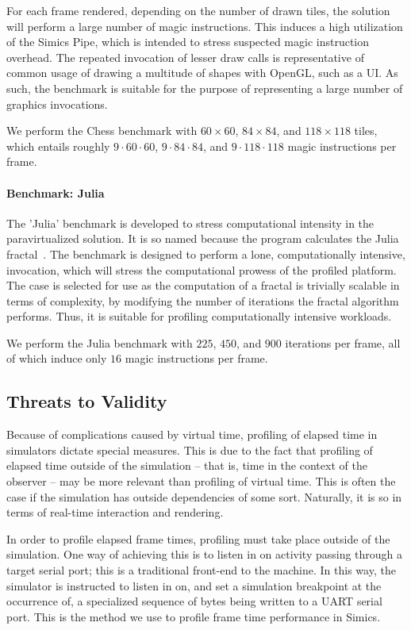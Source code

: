 \documentclass{article}
\newcommand{\masccite}[2][]{\cite{#2}}
\begin{document}
For each frame rendered, depending on the number of drawn tiles, the solution will perform a large number of magic instructions.
This induces a high utilization of the Simics Pipe, which is intended to stress suspected magic instruction overhead.
The repeated invocation of lesser draw calls is representative of common usage of drawing a multitude of shapes with OpenGL, such as a UI.
As such, the benchmark is suitable for the purpose of representing a large number of graphics invocations.

We perform the Chess benchmark with $60\times60$, $84\times84$, and $118\times118$ tiles, which entails roughly $9\cdot60\cdot60$, $9\cdot84\cdot84$, and $9\cdot118\cdot118$ magic instructions per frame.

\paragraph{Benchmark: Julia}
\label{par:experimentalmethodology_benchmarking_benchmarkjulia}
The 'Julia' benchmark is developed to stress computational intensity in the paravirtualized solution.
It is so named because the program calculates the Julia fractal~\masccite{web:tsiombikas:2014}.
The benchmark is designed to perform a lone, computationally intensive, invocation, which will stress the computational prowess of the profiled platform.
The case is selected for use as the computation of a fractal is trivially scalable in terms of complexity, by modifying the number of iterations the fractal algorithm performs.
Thus, it is suitable for profiling computationally intensive workloads.

We perform the Julia benchmark with $225$, $450$, and $900$ iterations per frame, all of which induce only $16$ magic instructions per frame.

\subsection{Threats to Validity}
\label{sec:threatstovalidity}
Because of complications caused by virtual time, profiling of elapsed time in simulators dictate special measures.
This is due to the fact that profiling of elapsed time outside of the simulation -- that is, time in the context of the observer -- may be more relevant than profiling of virtual time.
This is often the case if the simulation has outside dependencies of some sort.
Naturally, it is so in terms of real-time interaction and rendering.

In order to profile elapsed frame times, profiling must take place outside of the simulation.
One way of achieving this is to listen in on activity passing through a target serial port; this is a traditional front-end to the machine.
In this way, the simulator is instructed to listen in on, and set a simulation breakpoint at the occurrence of, a specialized sequence of bytes being written to a UART serial port.
This is the method we use to profile frame time performance in Simics.
\end{document}
